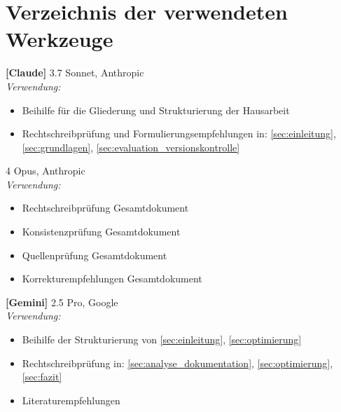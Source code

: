 \section{Verzeichnis der verwendeten Werkzeuge}
\label{sec:tools}

\begin{list}{}{%
\setlength{\labelwidth}{1.5cm}%
\setlength{\labelsep}{0.3cm}%
\setlength{\leftmargin}{2cm}%
\setlength{\itemindent}{0cm}%
\setlength{\listparindent}{0cm}%
}

\item[\textbf{[Claude]}] 3.7 Sonnet, Anthropic\\
\emph{Verwendung:} 
\begin{itemize}
  \item Beihilfe für die Gliederung und Strukturierung der Hausarbeit
  \item Rechtschreibprüfung und Formulierungsempfehlungen in: \ref{sec:einleitung}, \ref{sec:grundlagen}, \ref{sec:evaluation_versionskontrolle}
\end{itemize}

\item[\phantom{\textbf{[Claude]}}] 4 Opus, Anthropic\\
\emph{Verwendung:} 
\begin{itemize}
  \item Rechtschreibprüfung Gesamtdokument
  \item Konsistenzprüfung Gesamtdokument
  \item Quellenprüfung Gesamtdokument
  \item  Korrekturempfehlungen Gesamtdokument
\end{itemize}


\item[\textbf{[Gemini]}] 2.5 Pro, Google\\
\emph{Verwendung:} 
\begin{itemize}
  \item Beihilfe der Strukturierung von \ref{sec:einleitung}, \ref{sec:optimierung}
  \item Rechtschreibprüfung in: \ref{sec:analyse_dokumentation}, \ref{sec:optimierung}, \ref{sec:fazit}
  \item Literaturempfehlungen
\end{itemize}

\end{list}
